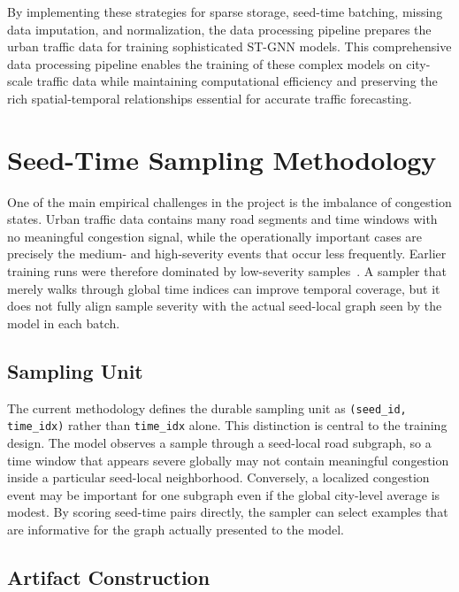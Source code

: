 \documentclass[11pt, a4paper]{article}
\begin{document}
By implementing these strategies for sparse storage, seed-time batching, missing data imputation, and normalization, the data processing pipeline prepares the urban traffic data for training sophisticated ST-GNN models. This comprehensive data processing pipeline enables the training of these complex models on city-scale traffic data while maintaining computational efficiency and preserving the rich spatial-temporal relationships essential for accurate traffic forecasting.

\section{Seed-Time Sampling Methodology}

One of the main empirical challenges in the project is the imbalance of congestion states. Urban traffic data contains many road segments and time windows with no meaningful congestion signal, while the operationally important cases are precisely the medium- and high-severity events that occur less frequently. Earlier training runs were therefore dominated by low-severity samples~\cite{he2009learning}. A sampler that merely walks through global time indices can improve temporal coverage, but it does not fully align sample severity with the actual seed-local graph seen by the model in each batch.

\subsection{Sampling Unit}

The current methodology defines the durable sampling unit as \texttt{(seed\_id, time\_idx)} rather than \texttt{time\_idx} alone. This distinction is central to the training design. The model observes a sample through a seed-local road subgraph, so a time window that appears severe globally may not contain meaningful congestion inside a particular seed-local neighborhood. Conversely, a localized congestion event may be important for one subgraph even if the global city-level average is modest. By scoring seed-time pairs directly, the sampler can select examples that are informative for the graph actually presented to the model.

\subsection{Artifact Construction}
\end{document}
